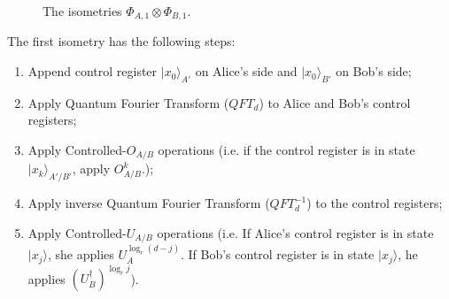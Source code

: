 \documentclass[11pt,letterpaper]{article}
\newcommand{\ket}[1]{|#1\rangle}
\newcommand{\x}{\otimes}
\newcommand{\ct}{^{\dagger}}
\newcommand{\1}{\mathbb{1}}
\theoremstyle{definition}
\begin{document}
\begin{figure}[H]
	\caption{The isometries $\Phi_{A,1} \x \Phi_{B,1}$.}
\end{figure}

The first isometry has the following steps:
\begin{enumerate}
	\item Append control register $\ket{x_0}_{A'}$ on Alice's side and $\ket{x_0}_{B'}$ on Bob's side;
	\item Apply Quantum Fourier Transform ($QFT_d$) to Alice and Bob's control registers;
	\item Apply Controlled-$O_{A/B}$ operations (i.e. if the control register is in state $\ket{x_k}_{A'/ B'}$, apply
	$O_{A/B}^k$.);
	\item Apply inverse Quantum Fourier Transform ($QFT_d^{-1}$) to the control registers;
	\item Apply Controlled-$U_{A/B}$ operations (i.e. If Alice's control register is in state $\ket{x_j}$, she applies
	$U_A^{\log_r (d-j)}$. If Bob's control register is in state $\ket{x_j}$, he applies $(U_B\ct)^{\log_r j}$).
\end{enumerate}
\end{document}
